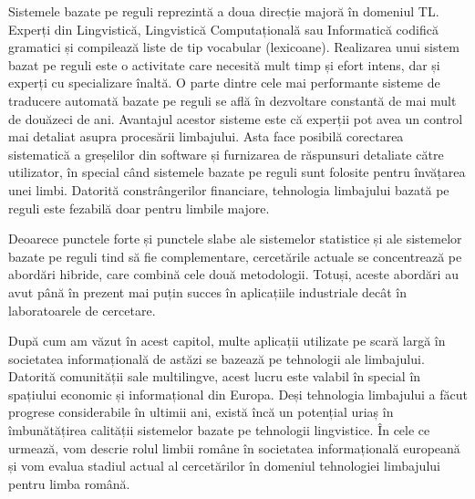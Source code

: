 \documentclass[]{../../metanetpaper}
\begin{document}
\begin{multicols}{2}
Sistemele bazate pe reguli reprezintă a doua direcție majoră în domeniul TL. Experți din Lingvistică, Lingvistică Computațională sau Informatică codifică gramatici și compilează liste de tip vocabular (lexicoane). Realizarea unui sistem bazat pe reguli este o activitate care necesită mult timp și efort intens, dar și experți cu specializare înaltă. O parte dintre cele mai performante sisteme de traducere automată bazate pe reguli se află în dezvoltare constantă de mai mult de douăzeci de ani. Avantajul acestor sisteme este că experții pot avea un control mai detaliat asupra procesării limbajului. Asta face posibilă corectarea sistematică a greșelilor din software și furnizarea de răspunsuri detaliate către utilizator, în special când sistemele bazate pe reguli sunt folosite pentru învățarea unei limbi. Datorită constrângerilor financiare, tehnologia limbajului bazată pe reguli este fezabilă doar pentru limbile majore.

Deoarece punctele forte și punctele slabe ale sistemelor statistice și ale sistemelor bazate pe reguli tind să fie complementare, cercetările actuale se concentrează pe abordări hibride, care combină cele două metodologii. Totuși, aceste abordări au avut până în prezent mai puțin succes în aplicațiile industriale decât în laboratoarele de cercetare.

După cum am văzut în acest capitol, multe aplicații utilizate pe scară largă în societatea informațională de astăzi se bazează pe tehnologii ale limbajului. Datorită comunității sale multilingve, acest lucru este valabil în special în spațiului economic și informațional din Europa. Deși tehnologia limbajului a făcut progrese considerabile în ultimii ani, există încă un potențial uriaș în îmbunătățirea calității sistemelor bazate pe tehnologii lingvistice. În cele ce urmează, vom descrie rolul limbii române în societatea informațională europeană și vom evalua stadiul actual al cercetărilor în domeniul tehnologiei limbajului pentru limba română. 

\end{multicols}

\clearpage

\end{document}
